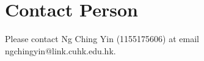 \section{Contact Person}
Please contact Ng Ching Yin (1155175606) at email ngchingyin@link.cuhk.edu.hk.